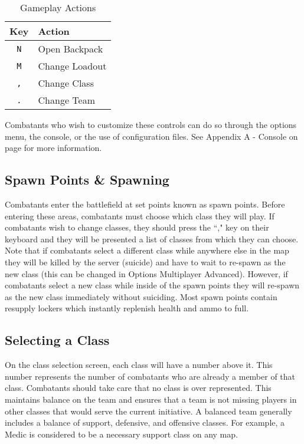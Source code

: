 \begin{table}[h!b!p!]
\caption{Gameplay Actions}
\begin{center}
\begin{tabular}{|c|l|}
	\hline
		Key & Action\\
	\hline
	\texttt{N}&Open Backpack\\
	\texttt{M}&Change Loadout\\
	\texttt{,}&Change Class\\
	\texttt{.}&Change Team\\
  	\hline
\end{tabular}
\end{center}
\label{table_gameplay_actions}
\end{table}

Combatants who wish to customize these controls can do so through the options menu, the console, or the use of configuration files. See Appendix A - Console on page \pageref{Appendix_A_Console} for more information.

\subsection{Spawn Points \& Spawning}
Combatants enter the battlefield at set points known as spawn points. Before entering these areas, combatants must choose which class they will play. If combatants wish to change classes, they should press the ``," key on their keyboard and they will be presented a list of classes from which they can choose. Note that if combatants select a different class while anywhere else in the map they will be killed by the server (suicide) and have to wait to re-spawn as the new class (this can be changed in Options Multiplayer Advanced). However, if combatants select a new class while inside of the spawn points they will re-spawn as the new class immediately without suiciding. Most spawn points contain resupply lockers which instantly replenish health and ammo to full.

\subsection{Selecting a Class}
On the class selection screen, each class will have a number above it. This number represents the number of  combatants who are already a member of that class. Combatants should take care that no class is over represented. This maintains balance on the team and ensures that a team is not missing players in other classes that would serve the current initiative. A balanced team generally includes a balance of support, defensive, and offensive classes. For example, a Medic is considered to be a necessary support class on any map.

